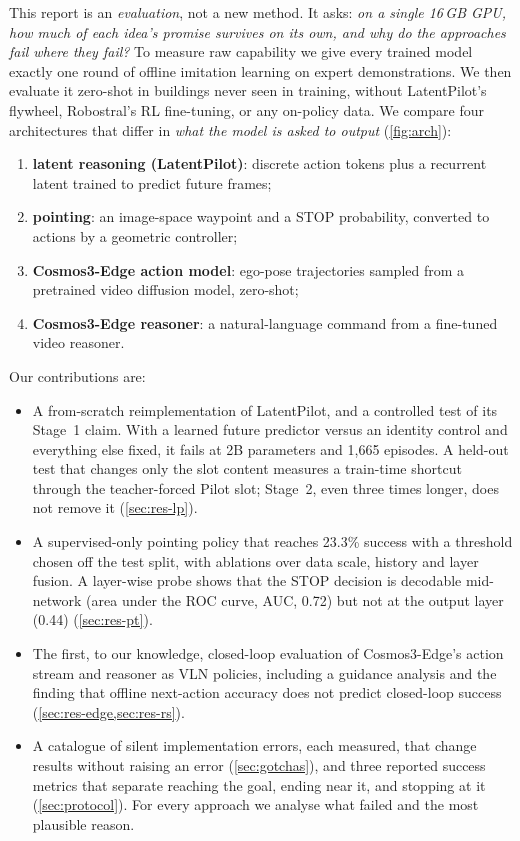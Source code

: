 \documentclass[11pt]{article}
\begin{document}
This report is an \emph{evaluation}, not a new method. It asks: \emph{on a single 16\,GB GPU, how much of each idea's
promise survives on its own, and why do the approaches fail where they fail?} To measure raw capability we give every
trained model exactly one round of offline imitation learning on expert demonstrations. We then evaluate it zero-shot
in buildings never seen in training, without LatentPilot's flywheel, Robostral's RL fine-tuning, or any on-policy
data. We compare four architectures that differ in \emph{what the model is asked to output} (\cref{fig:arch}):
\begin{enumerate}
  \item \textbf{latent reasoning (LatentPilot)}: discrete action tokens plus a recurrent latent trained to predict
        future frames;
  \item \textbf{pointing}: an image-space waypoint and a STOP probability, converted to actions by a geometric
        controller;
  \item \textbf{Cosmos3-Edge action model}: ego-pose trajectories sampled from a pretrained video diffusion model,
        zero-shot;
  \item \textbf{Cosmos3-Edge reasoner}: a natural-language command from a fine-tuned video reasoner.
\end{enumerate}

Our contributions are:
\begin{itemize}
  \item A from-scratch reimplementation of LatentPilot, and a controlled test of its Stage~1 claim. With a learned
        future predictor versus an identity control and everything else fixed, it fails at 2B parameters and 1,665
        episodes. A held-out test that changes only the slot content measures a train-time shortcut through the
        teacher-forced Pilot slot; Stage~2, even three times longer, does not remove it (\cref{sec:res-lp}).
  \item A supervised-only pointing policy that reaches 23.3\% success with a threshold chosen off the test split, with ablations over data scale, history and
        layer fusion. A layer-wise probe shows that the STOP decision is decodable mid-network (area under the ROC curve, AUC, 0.72) but not at the
        output layer (0.44) (\cref{sec:res-pt}).
  \item The first, to our knowledge, closed-loop evaluation of Cosmos3-Edge's action stream and reasoner as VLN policies,
        including a guidance analysis and the finding that offline next-action accuracy does not predict closed-loop
        success (\cref{sec:res-edge,sec:res-rs}).
  \item A catalogue of silent implementation errors, each measured, that change results without raising an error
        (\cref{sec:gotchas}), and three reported success metrics that separate reaching the goal, ending near it, and
        stopping at it (\cref{sec:protocol}). For every approach we analyse what failed and the most plausible reason.
\end{itemize}
\end{document}
